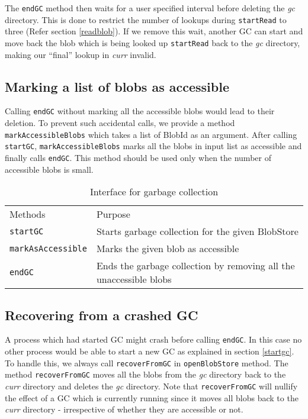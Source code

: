 The \texttt{endGC} method then waits for a user specified interval before deleting the \textit{gc} directory. This is done to restrict the number of lookups during \texttt{startRead} to three (Refer section \ref{readblob}). If we remove this wait, another GC can start and move back the blob which is being looked up \texttt{startRead} back to the \textit{gc} directory, making our ``final'' lookup in \textit{curr} invalid.

\subsection{Marking a list of blobs as accessible}
Calling \texttt{endGC} without marking all the accessible blobs would lead to their deletion. To prevent such accidental calls, we provide a method \texttt{markAccessibleBlobs} which takes a list of BlobId as an argument. After calling \texttt{startGC}, \texttt{markAccessibleBlobs} marks all the blobs in input list as accessible and finally calls \texttt{endGC}.
This method should be used only when the number of accessible blobs is small.

\begin{table}[hbt]
\caption{Interface for garbage collection}
\label{tab:interface-gc}
\begin{center}
  \begin{tabularx}{0.91\textwidth}{lX}
    \hline\noalign{\smallskip}
    Methods & Purpose \\
    \noalign{\smallskip}
    \hline
    \noalign{\smallskip}
    \texttt{startGC} & Starts garbage collection for the given BlobStore\\
    \texttt{markAsAccessible} & Marks the given blob as accessible\\
    \texttt{endGC} & Ends the garbage collection by removing all the unaccessible blobs\\
    \hline
  \end{tabularx}
\end{center}
\end{table}

\subsection{Recovering from a crashed GC} \label{recovercrashedgc}
A process which had started GC might crash before calling \texttt{endGC}. In this case no other process would be able to start a new GC as explained in section \ref{startgc}.
To handle this, we always call \texttt{recoverFromGC} in \texttt{openBlobStore} method. The method \texttt{recoverFromGC} moves all the blobs from the \textit{gc} directory back to the \textit{curr} directory and deletes the \textit{gc} directory.
Note that \texttt{recoverFromGC} will nullify the effect of a GC which is currently running since it moves all blobs back to the \textit{curr} directory - irrespective of whether they are accessible or not.
